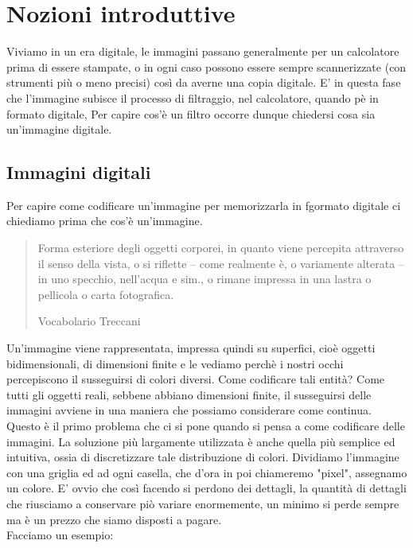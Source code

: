 \chapter{Nozioni introduttive}
Viviamo in un era digitale, le immagini passano generalmente per un calcolatore prima di essere stampate, o in ogni caso possono essere sempre scannerizzate (con strumenti più o meno precisi) così da averne una copia digitale.
E' in questa fase che l'immagine subisce il processo di filtraggio, nel calcolatore, quando pè in formato digitale, Per capire cos'è un filtro occorre dunque chiedersi cosa sia un'immagine digitale.

\section{Immagini digitali}
Per capire come codificare un'immagine per memorizzarla in fgormato digitale ci chiediamo prima che cos'è un'immagine.

\begin{quote}
\epigraph{Forma esteriore degli oggetti corporei, in quanto viene percepita attraverso il senso della vista, o si riflette – come realmente è, o variamente alterata – in uno specchio, nell’acqua e sim., o rimane impressa in una lastra o pellicola o carta fotografica.}{Vocabolario Treccani}
\end{quote}


\noindent
Un'immagine viene rappresentata, impressa quindi su superfici, cioè oggetti bidimensionali, di dimensioni finite e le vediamo perchè i nostri occhi percepiscono il susseguirsi di colori diversi. Come codificare tali entità?
Come tutti gli oggetti reali, sebbene abbiano dimensioni finite, il susseguirsi delle immagini avviene in una maniera che possiamo considerare come continua. Questo è il primo problema che ci si pone quando si pensa a come codificare delle immagini.
La soluzione più largamente utilizzata è anche quella più semplice ed intuitiva, ossia di discretizzare tale distribuzione di colori. Dividiamo l'immagine con una griglia ed ad ogni casella, che d'ora in poi chiameremo "pixel", assegnamo un colore. 
E' ovvio che così facendo si perdono dei dettagli, la quantità di dettagli che riusciamo a conservare piò variare enormemente, un minimo si perde sempre ma è un prezzo che siamo disposti a pagare.\\
Facciamo un esempio:

